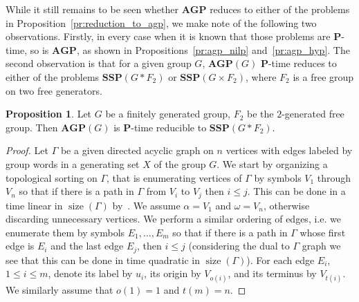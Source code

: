 \documentclass[10pt]{amsart}
\theoremstyle{definition}
\newtheorem{proposition}[theorem]{Proposition}
\DeclareMathOperator{\size}{{size}}
\def\P{{\mathbf{P}}}
\def\SSP{{\mathbf{SSP}}}
\def\AGP{{\mathbf{AGP}}}
\begin{document}
While it still remains to be seen whether $\AGP$ reduces to either of the problems in Proposition~\ref{pr:reduction_to_agp}, we make note of the following two observations. Firstly, in every case when it is known that those problems are $\P$-time, so is $\AGP$, as shown in Propositions~\ref{pr:agp_nilp} and~\ref{pr:agp_hyp}.
The second observation is that for a given group $G$, $\AGP(G)$ $\P$-time reduces to either of the problems $\SSP(G\ast F_2)$ or $\SSP(G\times F_2)$, where $F_2$ is a free group on two free generators.

\begin{proposition}\label{pr:agp_to_ssp_star}
Let $G$ be a finitely generated group, $F_2$ be the $2$-generated free group. Then $\AGP(G)$ is $\P$-time reducible to $\SSP(G\ast F_2)$.
\end{proposition}
\begin{proof}
Let $\Gamma$ be a given directed acyclic graph on $n$ vertices with edges labeled by group words in a generating set $X$ of the group $G$. We start by organizing a topological sorting on $\Gamma$, that is enumerating vertices of $\Gamma$ by symbols $V_1$ through $V_n$ so that if there is a path in $\Gamma$ from $V_i$ to $V_j$ then $i\le j$. This can be done in a time linear in $\size(\Gamma)$ by~\cite{Kahn}. We assume $\alpha=V_1$ and $\omega=V_n$, otherwise discarding unnecessary vertices. We perform a similar ordering of edges, i.e. we enumerate them by symbols $E_1,\ldots, E_m$ so that if there is a path in $\Gamma$ whose first edge is $E_i$ and the last edge $E_j$, then $i\le j$ (considering the dual to $\Gamma$ graph we see that this can be done in time quadratic in $\size(\Gamma)$). For each edge $E_i$, $1\le i\le m$, denote its label by $u_i$, its origin by $V_{o(i)}$, and its terminus by $V_{t(i)}$. We similarly assume that $o(1)=1$ and $t(m)=n$.


\end{proof}
\end{document}
